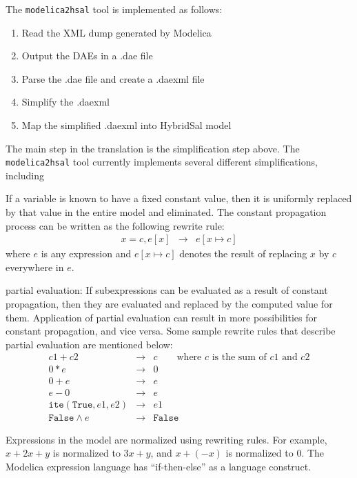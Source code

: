 \documentclass{llncs}
\newcommand\ite{{\mathtt{ite}}}
\newcommand\True{{\mathtt{True}}}
\newcommand\False{{\mathtt{False}}}
\begin{document}
The {\tt{modelica2hsal}} tool is implemented as follows:
\begin{enumerate}
\item  
Read the XML dump generated by Modelica 
\item
Output the DAEs in a .dae file
\item
Parse the .dae file and create a .daexml file
\item
Simplify the .daexml 
\item
Map the simplified .daexml into HybridSal model
\end{enumerate}
The main step in the translation is the simplification step above.
The {\tt{modelica2hsal}} tool currently implements several different
simplifications, including
\begin{description}
\item[Constant propagation:]  If a variable is known to have a fixed constant value,
then it is uniformly replaced by that value in the entire model and eliminated.
The constant propagation process can be written as the following rewrite rule:
\begin{eqnarray}
 x = c,  e[x]  & \rightarrow & e[x \mapsto c] 
\label{eqn-first}
\end{eqnarray}
where $e$ is any expression and $e[x\mapsto c]$ denotes the result of 
replacing $x$ by $c$ everywhere in $e$.
\item partial evaluation:  
If subexpressions can be evaluated as a result of constant propagation, then they
are evaluated and replaced by the computed value for them.  Application of
partial evaluation can result in more possibilities for constant propagation, and vice versa.
Some sample rewrite rules that describe partial evaluation are mentioned below:
\begin{eqnarray}
c1 + c2 & \rightarrow & c  \qquad \mbox{where $c$ is the sum of $c1$ and $c2$}
\\
0 * e & \rightarrow & 0
\\
0 + e & \rightarrow & e
\\
e - 0 & \rightarrow & e
\\
\ite(\True, e1, e2) & \rightarrow & e1
\\
\False \wedge e & \rightarrow & \False
\end{eqnarray}
\item[Term normalization:]
Expressions in the model are normalized using rewriting rules. For example,
$x + 2x + y$ is  normalized to $3x + y$, and $x + (-x)$ is normalized to $0$.
The Modelica expression language has ``if-then-else'' as a language construct.

\end{description}
\end{document}
